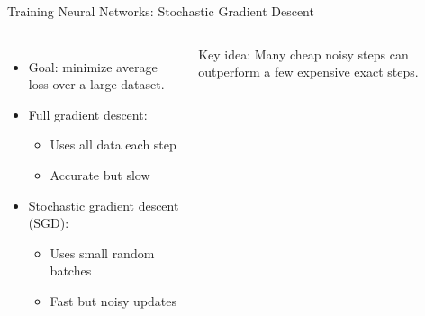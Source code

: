 \documentclass[aspectratio=169]{beamer}
\newcommand{\1}{\mathbf{1}}
\begin{document}
\begin{frame}{Training Neural Networks: Stochastic Gradient Descent}
    \small
    
    \begin{columns}
    \begin{itemize}
        \item Goal: minimize average loss over a large dataset.
        \item Full gradient descent:
        \begin{itemize}
            \item Uses all data each step
            \item Accurate but slow
        \end{itemize}
        \item Stochastic gradient descent (SGD):
        \begin{itemize}
            \item Uses small random batches
            \item Fast but noisy updates
        \end{itemize}
    \end{itemize}
    
    \vspace{0.5em}
    Key idea:  
    Many cheap noisy steps can outperform a few expensive exact steps.
    
    
    \begin{center}
    \end{center}
    
    \end{columns}
    \end{frame}
\end{document}
